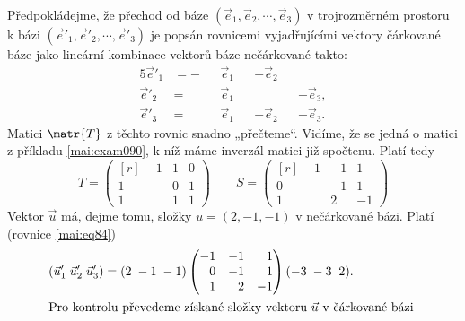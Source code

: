 % 
\begin{mdframed}[style=mdexam]
  \begin{example}\label{mai:exam089}
    \begingroup
    \renewcommand\arraystretch{1.0}
    \renewcommand\arraycolsep{3pt}
    Předpokládejme, že přechod od báze \((\vec{e}_1, \vec{e}_2, \cdots, \vec{e}_3)\) v
    trojrozměrném prostoru k bázi \((\vec{e}'_1,\vec{e}'_2, \cdots, \vec{e}'_3)\) je popsán
    rovnicemi vyjadřujícími vektory čárkované báze jako lineární kombinace vektorů báze
    nečárkované takto:
    \begin{alignat*}{5}
      \vec{e}'_1&=-&& \vec{e}_1 && +\vec{e}_2 &&       \\
      \vec{e}'_2&= && \vec{e}_1 &&      && +\vec{e}_3, \\
      \vec{e}'_3&= && \vec{e}_1 && +\vec{e}_2 && +\vec{e}_3.    
    \end{alignat*}  
    Matici \(\matr{T}\) z těchto rovnic snadno „přečteme“. Vidíme, že se jedná o matici z
    příkladu \ref{mai:exam090}, k níž máme inverzál matici již spočtenu. Platí tedy
    \begin{equation*}
      T = 
        \begin{pmatrix*}[r]
         -1 & 1 & 0 \\
          1 & 0 & 1 \\
          1 & 1 & 1 
        \end{pmatrix*} 
      \qquad
      S = 
      \begin{pmatrix*}[r]
        -1 & -1 &  1 \\
         0 & -1 &  1 \\
         1 &  2 & -1
      \end{pmatrix*}     
    \end{equation*}
    Vektor \(\vec{u}\) má, dejme tomu, složky \(u = (2, -1, -1)\) v nečárkované bázi. Platí
    (rovnice \ref{mai:eq84})
    \begin{gather*}    
      \begin{aligned}
        (\vec{u}'_1\; \vec{u}'_2\;  \vec{u}'_3) &= (2\; -1\; -1)
        \begin{pmatrix*}[r]
          -1 & -1 &  1 \\
           0 & -1 &  1 \\
           1 &  2 & -1
        \end{pmatrix*} 
        (-3\; -3\;\; 2).                            \\
        \shortintertext{Pro kontrolu převedeme získané složky vektoru \(\vec{u}\) v čárkované bázi 
}
\end{aligned}
\end{gather*}
\end{example}
\end{mdframed}
